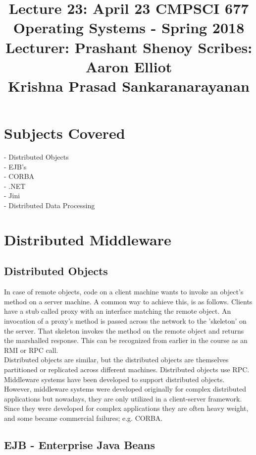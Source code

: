\documentclass[a4paper]{article}
\title{
Lecture 23: April 23\linebreak
CMPSCI 677 Operating Systems - Spring 2018 \linebreak
Lecturer: Prashant Shenoy \linebreak
\small Scribes:\\ Aaron Elliot\\Krishna Prasad Sankaranarayanan
}
\begin{document}
\maketitle

\section* {Subjects Covered}
- Distributed Objects\\
- EJB's\\
- CORBA\\
- .NET \\
- Jini\\
- Distributed Data Processing \\



\section{Distributed Middleware}



\subsection{Distributed Objects}
\label{sec:aa}

In case of remote objects, code on a client machine wants to invoke an object's method on a server machine. A common way to achieve this, is as follows. Clients have a stub called proxy with an interface matching the remote object. An invocation of a proxy's method is passed across the network to the 'skeleton' on the server. That skeleton invokes the method on the remote object and returns the marshalled response. This can be recognized from earlier in the course as an RMI or RPC call.\\

Distributed objects are similar, but the distributed objects are themselves partitioned or replicated across different machines. Distributed objects use RPC. Middleware systems have been developed to support distributed objects. However, middleware systems were developed originally for complex distributed applications but nowadays, they are only utilized in a client-server framework. Since they were developed for complex applications they are often heavy weight, and some became commercial failures; e.g. CORBA.
\subsection{EJB - Enterprise Java Beans}
\end{document}
